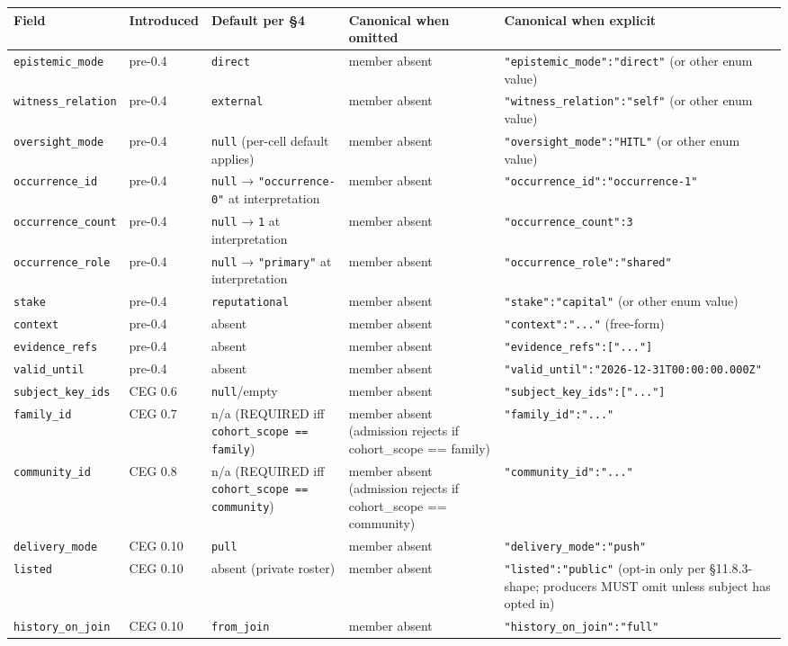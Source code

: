 \documentclass[11pt]{article}
\begin{document}
{\scriptsize
\begin{longtable}{|p{3.2cm}|p{3.2cm}|p{3.2cm}|p{3.2cm}|p{3.2cm}|}\hline
\textbf{Field} & \textbf{Introduced} & \textbf{Default per §4} & \textbf{Canonical when omitted} & \textbf{Canonical when explicit} \\ \hline\endhead
\texttt{epistemic\_mode} & pre-0.4 & \texttt{direct} & member absent & \texttt{"epistemic\_mode":"direct"} (or other enum value) \\ \hline
\texttt{witness\_relation} & pre-0.4 & \texttt{external} & member absent & \texttt{"witness\_relation":"self"} (or other enum value) \\ \hline
\texttt{oversight\_mode} & pre-0.4 & \texttt{null} (per-cell default applies) & member absent & \texttt{"oversight\_mode":"HITL"} (or other enum value) \\ \hline
\texttt{occurrence\_id} & pre-0.4 & \texttt{null} → \texttt{"occurrence-0"} at interpretation & member absent & \texttt{"occurrence\_id":"occurrence-1"} \\ \hline
\texttt{occurrence\_count} & pre-0.4 & \texttt{null} → \texttt{1} at interpretation & member absent & \texttt{"occurrence\_count":3} \\ \hline
\texttt{occurrence\_role} & pre-0.4 & \texttt{null} → \texttt{"primary"} at interpretation & member absent & \texttt{"occurrence\_role":"shared"} \\ \hline
\texttt{stake} & pre-0.4 & \texttt{reputational} & member absent & \texttt{"stake":"capital"} (or other enum value) \\ \hline
\texttt{context} & pre-0.4 & absent & member absent & \texttt{"context":"..."} (free-form) \\ \hline
\texttt{evidence\_refs} & pre-0.4 & absent & member absent & \texttt{"evidence\_refs":["..."]} \\ \hline
\texttt{valid\_until} & pre-0.4 & absent & member absent & \texttt{"valid\_until":"2026-12-31T00:00:00.000Z"} \\ \hline
\texttt{subject\_key\_ids} & CEG 0.6 & \texttt{null}/empty & member absent & \texttt{"subject\_key\_ids":["..."]} \\ \hline
\texttt{family\_id} & CEG 0.7 & n/a (REQUIRED iff \texttt{cohort\_scope == family}) & member absent (admission rejects if cohort\_scope == family) & \texttt{"family\_id":"..."} \\ \hline
\texttt{community\_id} & CEG 0.8 & n/a (REQUIRED iff \texttt{cohort\_scope == community}) & member absent (admission rejects if cohort\_scope == community) & \texttt{"community\_id":"..."} \\ \hline
\texttt{delivery\_mode} & CEG 0.10 & \texttt{pull} & member absent & \texttt{"delivery\_mode":"push"} \\ \hline
\texttt{listed} & CEG 0.10 & absent (private roster) & member absent & \texttt{"listed":"public"} (opt-in only per §11.8.3-shape; producers MUST omit unless subject has opted in) \\ \hline
\texttt{history\_on\_join} & CEG 0.10 & \texttt{from\_join} & member absent & \texttt{"history\_on\_join":"full"} \\ \hline
\end{longtable}}
\end{document}
